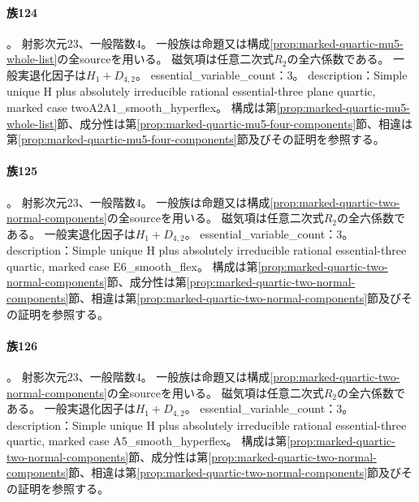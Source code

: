 \paragraph{族124}\label{catalogue:R4_MARKED_QUARTIC_MU5_TWOA2A1_SMOOTH_HYPERFLEX_23}
。
射影次元$23$、一般階数$4$。
一般族は命題又は構成\ref{prop:marked-quartic-mu5-whole-list}の全sourceを用いる。
磁気項は任意二次式$R_2$の全六係数である。
一般実退化因子は$H_{1}+D_{4,2}$。
essential\_variable\_count：3。
description：Simple unique H plus absolutely irreducible rational essential-three plane quartic, marked case twoA2A1\_smooth\_hyperflex。
構成は第\ref{prop:marked-quartic-mu5-whole-list}節、成分性は第\ref{prop:marked-quartic-mu5-four-components}節、相違は第\ref{prop:marked-quartic-mu5-four-components}節及びその証明を参照する。

\paragraph{族125}\label{catalogue:R4_MARKED_QUARTIC_MU6_E6_SMOOTH_FLEX_23}
。
射影次元$23$、一般階数$4$。
一般族は命題又は構成\ref{prop:marked-quartic-two-normal-components}の全sourceを用いる。
磁気項は任意二次式$R_2$の全六係数である。
一般実退化因子は$H_{1}+D_{4,2}$。
essential\_variable\_count：3。
description：Simple unique H plus absolutely irreducible rational essential-three quartic, marked case E6\_smooth\_flex。
構成は第\ref{prop:marked-quartic-two-normal-components}節、成分性は第\ref{prop:marked-quartic-two-normal-components}節、相違は第\ref{prop:marked-quartic-two-normal-components}節及びその証明を参照する。

\paragraph{族126}\label{catalogue:R4_MARKED_QUARTIC_MU5_A5_SMOOTH_HYPERFLEX_23}
。
射影次元$23$、一般階数$4$。
一般族は命題又は構成\ref{prop:marked-quartic-two-normal-components}の全sourceを用いる。
磁気項は任意二次式$R_2$の全六係数である。
一般実退化因子は$H_{1}+D_{4,2}$。
essential\_variable\_count：3。
description：Simple unique H plus absolutely irreducible rational essential-three quartic, marked case A5\_smooth\_hyperflex。
構成は第\ref{prop:marked-quartic-two-normal-components}節、成分性は第\ref{prop:marked-quartic-two-normal-components}節、相違は第\ref{prop:marked-quartic-two-normal-components}節及びその証明を参照する。

